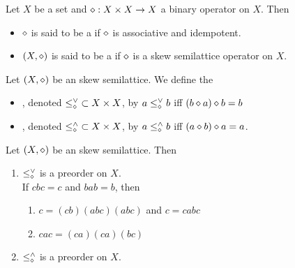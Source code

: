 \documentclass{book}
\begin{document}
	\begin{defn} 
		Let $X$ be a set and $\diamond:X \times X \rightarrow X$ a binary operator on $X$. Then 
		\begin{itemize}
			\item $\diamond$ is said to be a  if $\diamond$ is associative and idempotent.
			\item $(X, \diamond)$ is said to be a  if $\diamond$ is a skew semilattice operator on $X$.
		\end{itemize}
	\end{defn}
	
	\begin{defn} 
		Let $(X, \diamond)$ be an skew semilattice. We define the 
		\begin{itemize}
			\item {}, denoted ${\leq^{\vee}_{\diamond}} \subset X \times X$, by $a \leq^{\vee}_{\diamond} b$ iff $(b \diamond a) \diamond b = b$
			\item {}, denoted ${\leq^{\wedge}_{\diamond}} \subset X \times X$, by $a \leq^{\wedge}_{\diamond} b$ iff $(a \diamond b) \diamond a = a$. 
		\end{itemize}
	\end{defn}
	
	\begin{ex} 
		Let $(X, \diamond)$ be an skew semilattice. Then 
		\begin{enumerate}
			\item $\leq^{\vee}_{\diamond}$ is a preorder on $X$. \\
			 If $cbc = c$ and $bab = b$, then 
			\begin{enumerate}
				\item $c = (cb)(abc)(abc)$ and $c = cabc$
				\item $cac = (ca)(ca)(bc)$
			\end{enumerate}
			\item $\leq^{\wedge}_{\diamond}$ is a preorder on $X$.
		\end{enumerate}
	\end{ex}
	
\end{document}
